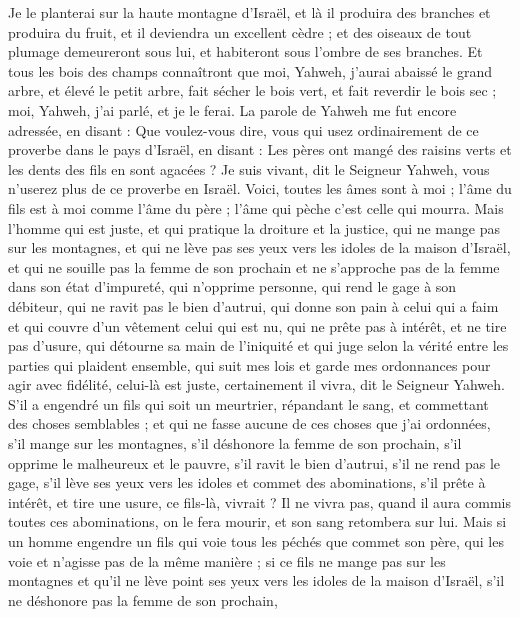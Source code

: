 \begin{multicols}{2}
Je le planterai sur la haute montagne d'Israël, et là il produira des branches et produira du fruit, et il deviendra un excellent cèdre ; et des oiseaux de tout plumage demeureront sous lui, et habiteront sous l'ombre de ses branches.
Et tous les bois des champs connaîtront que moi, Yahweh, j'aurai abaissé le grand arbre, et élevé le petit arbre, fait sécher le bois vert, et fait reverdir le bois sec ; moi, Yahweh, j'ai parlé, et je le ferai.
\VerseOne{}La parole de Yahweh me fut encore adressée, en disant :
Que voulez-vous dire, vous qui usez ordinairement de ce proverbe dans le pays d'Israël, en disant : Les pères ont mangé des raisins verts et les dents des fils en sont agacées\FTNT{} ?
Je suis vivant, dit le Seigneur Yahweh, vous n'userez plus de ce proverbe en Israël.
Voici, toutes les âmes sont à moi ; l'âme du fils est à moi comme l'âme du père ; l'âme qui pèche c’est celle qui mourra.
Mais l'homme qui est juste, et qui pratique la droiture et la justice,
qui ne mange pas sur les montagnes, et qui ne lève pas ses yeux vers les idoles de la maison d'Israël, et qui ne souille pas la femme de son prochain et ne s’approche pas de la femme dans son état d'impureté\FTNT{},
qui n’opprime personne, qui rend le gage à son débiteur\FTNT{}, qui ne ravit pas le bien d'autrui, qui donne son pain à celui qui a faim et qui couvre d'un vêtement celui qui est nu\FTNT{},
qui ne prête pas à intérêt, et ne tire pas d’usure, qui détourne sa main de l'iniquité et qui juge selon la vérité entre les parties qui plaident ensemble\FTNT{},
qui suit mes lois et garde mes ordonnances pour agir avec fidélité, celui-là est juste, certainement il vivra, dit le Seigneur Yahweh.
S’il a engendré un fils qui soit un meurtrier, répandant le sang, et commettant des choses semblables ;
et qui ne fasse aucune de ces choses que j'ai ordonnées, s’il mange sur les montagnes, s’il déshonore la femme de son prochain,
s’il opprime le malheureux et le pauvre, s’il ravit le bien d'autrui, s’il ne rend pas le gage, s’il lève ses yeux vers les idoles et commet des abominations,
s’il prête à intérêt, et tire une usure, ce fils-là, vivrait ? Il ne vivra pas, quand il aura commis toutes ces abominations, on le fera mourir, et son sang retombera sur lui.
Mais si un homme engendre un fils qui voie tous les péchés que commet son père, qui les voie et n’agisse pas de la même manière ;
si ce fils ne mange pas sur les montagnes et qu'il ne lève point ses yeux vers les idoles de la maison d'Israël, s’il ne déshonore pas la femme de son prochain,

\end{multicols}
